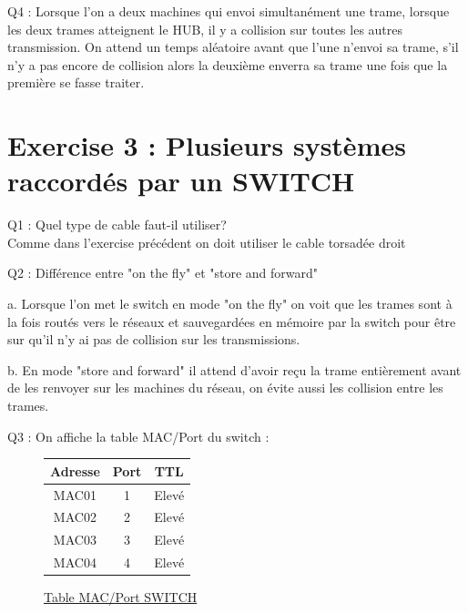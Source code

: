 \documentclass[11pt, openright]{book}
\begin{document}
\begin{dent}{Q4 :}
	Lorsque l'on a deux machines qui envoi simultanément une trame, lorsque les deux trames atteignent le HUB, il y a collision sur toutes les autres transmission. On attend un temps aléatoire avant que l'une n'envoi sa trame, s'il n'y a pas encore de collision alors la deuxième enverra sa trame une fois que la première se fasse traiter. 
\end{dent}


\newpage

\section{Exercise 3 : Plusieurs systèmes raccordés par un SWITCH}

\begin{dent}{Q1 :} Quel type de cable faut-il utiliser?\\
	Comme dans l'exercise précédent on doit utiliser le cable torsadée droit
\end{dent}

\begin{dent}{Q2 :} Différence entre "on the fly" et "store and forward"
	\begin{enum}{-15pt}{-15pt}
		\item[a.] Lorsque l'on met le switch en mode "on the fly" on voit que les trames sont à la fois routés vers le réseaux et sauvegardées en mémoire par la switch pour être sur qu'il n'y ai pas de collision sur les transmissions.  
		\item[b.] En mode "store and forward" il attend d'avoir reçu la trame entièrement avant de les renvoyer sur les machines du réseau, on évite aussi les collision entre les trames. 
	\end{enum}
\end{dent}

\begin{dent}{Q3 :} On affiche la table MAC/Port du switch :
	\begin{figure}[ht]
		\centering
		\begin{tabular}{|c|c|c|}
			\hline
			Adresse & Port & TTL   \\
			\hline
			MAC01   & 1    & Elevé \\
			\hline
			MAC02   & 2    & Elevé \\
			\hline
			MAC03   & 3    & Elevé \\
			\hline
			MAC04   & 4    & Elevé \\
			\hline
		\end{tabular}
		\caption{\ul{Table MAC/Port SWITCH}}
	\end{figure}
\end{dent}
\end{document}
